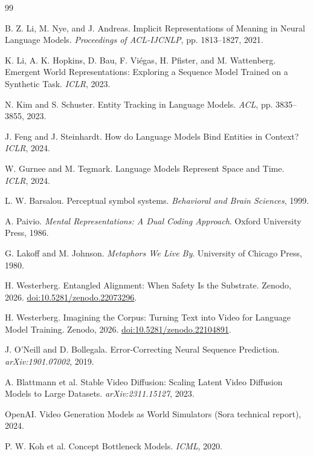 \documentclass[11pt,a4paper]{article}
\begin{document}
\begin{thebibliography}{99}

 B. Z. Li, M. Nye, and J. Andreas. Implicit Representations of Meaning in Neural Language Models. \emph{Proceedings of ACL-IJCNLP}, pp. 1813--1827, 2021.

 K. Li, A. K. Hopkins, D. Bau, F. Vi\'egas, H. Pfister, and M. Wattenberg. Emergent World Representations: Exploring a Sequence Model Trained on a Synthetic Task. \emph{ICLR}, 2023.

 N. Kim and S. Schuster. Entity Tracking in Language Models. \emph{ACL}, pp. 3835--3855, 2023.

 J. Feng and J. Steinhardt. How do Language Models Bind Entities in Context? \emph{ICLR}, 2024.

 W. Gurnee and M. Tegmark. Language Models Represent Space and Time. \emph{ICLR}, 2024.

 L. W. Barsalou. Perceptual symbol systems. \emph{Behavioral and Brain Sciences}, 1999.

 A. Paivio. \emph{Mental Representations: A Dual Coding Approach}. Oxford University Press, 1986.

 G. Lakoff and M. Johnson. \emph{Metaphors We Live By}. University of Chicago Press, 1980.

 H. Westerberg. Entangled Alignment: When Safety Is the Substrate. Zenodo, 2026. \href{https://doi.org/10.5281/zenodo.22073296}{doi:10.5281/zenodo.22073296}.

 H. Westerberg. Imagining the Corpus: Turning Text into Video for Language Model Training. Zenodo, 2026. \href{https://doi.org/10.5281/zenodo.22104891}{doi:10.5281/zenodo.22104891}.

 J. O'Neill and D. Bollegala. Error-Correcting Neural Sequence Prediction. \emph{arXiv:1901.07002}, 2019.

 A. Blattmann et al. Stable Video Diffusion: Scaling Latent Video Diffusion Models to Large Datasets. \emph{arXiv:2311.15127}, 2023.

 OpenAI. Video Generation Models as World Simulators (Sora technical report), 2024.

 P. W. Koh et al. Concept Bottleneck Models. \emph{ICML}, 2020.


\end{thebibliography}
\end{document}
